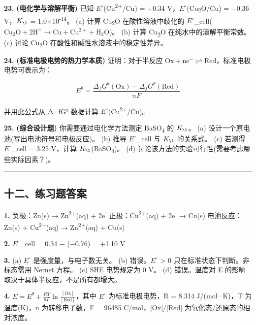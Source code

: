 \textbf{23.} \textbf{(电化学与溶解平衡)} 已知 \(E^{\circ}\)(Cu\textsuperscript{2+}/Cu) = +0.34 V，\(E^{\circ}\)(Cu\textsubscript{2}O/Cu) = −0.36 V，\(K_{\1}\) = 1.0×10\textsuperscript{-14}。
(a) 计算 Cu\textsubscript{2}O 在酸性溶液中歧化的 \(E^{\circ}\)\_cell(\(\mathrm{Cu_2O + 2H^+ \to Cu + Cu^{2+} + H_2O}\))。
(b) 计算 Cu\textsubscript{2}O 在纯水中的溶解平衡常数。
(c) 讨论 Cu\textsubscript{2}O 在酸性和碱性水溶液中的稳定性差异。

\textbf{24.} \textbf{(标准电极电势的热力学本质)} 证明：对于半反应 \(\mathrm{Ox + ne^- \rightleftharpoons Red}\)，标准电极电势可表示为：

\[E^\theta = \frac{\Delta_f G^\theta(\mathrm{Ox}) - \Delta_f G^\theta(\mathrm{Red})}{nF}\]

并用此公式从 Δ\_fG° 数据计算 \(E^{\circ}\)(Cu\textsuperscript{2+}/Cu)。

\textbf{25.} \textbf{(综合设计题)} 你需要通过电化学方法测定 BaSO\textsubscript{4} 的 \(K_{\1}\)。
(a) 设计一个原电池(写出电池符号和电极反应)。
(b) 推导 \(E^{\circ}\)\_cell 与 \(K_{\1}\) 的关系式。
(c) 若测得 \(E^{\circ}\)\_cell = 3.25 V，计算 \(K_{\1}\)(BaSO\textsubscript{4})。
(d) 讨论该方法的实验可行性(需要考虑哪些实际因素？)。

\begin{center}\rule{0.5\linewidth}{0.5pt}\end{center}

\subsection{十二、练习题答案}\label{ux5341ux4e8cux7ec3ux4e60ux9898ux7b54ux6848}

\textbf{1.}
负极：Zn(s) → Zn\textsuperscript{2+}(aq) + 2e\textsuperscript{-}
正极：Cu\textsuperscript{2+}(aq) + 2e\textsuperscript{-} → Cu(s)
电池反应：Zn(s) + Cu\textsuperscript{2+}(aq) → Zn\textsuperscript{2+}(aq) + Cu(s)

\textbf{2.} \(E^{\circ}\)\_cell = 0.34 − (−0.76) = +1.10 V

\textbf{3.}
(a) \(E^{\circ}\) 是强度量，与电子数无关。
(b) 错误。\(E^{\circ}\) \textgreater{} 0 只在标准状态下判断。非标态需用 Nernst 方程。
(c) SHE 电势规定为 0 V。
(d) 错误。温度对 E 的影响取决于具体半反应，不是所有都增大。

\textbf{4.} \(E = E^\theta + \frac{RT}{nF}\ln\frac{[\mathrm{Ox}]}{[\mathrm{Red}]}\)，其中 \(E^{\circ}\) 为标准电极电势，R = 8.314 J/(mol·K)，T 为温度(K)，n 为转移电子数，F = 96485 C/mol，{[}Ox{]}/{[}Red{]} 为氧化态/还原态的相对浓度。


